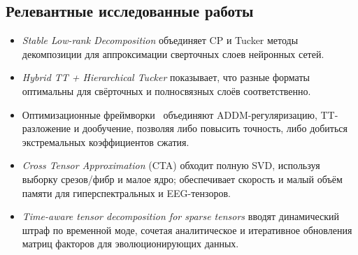 \subsection*{Релевантные исследованные работы}

\begin{itemize}\setlength\itemsep{0.25em}
    \item \emph{Stable Low-rank Decomposition} \cite{stable_low_rank_tensor_decomposition} объединяет CP и Tucker методы декомпозиции для аппроксимации сверточных слоев нейронных сетей.
    \item
    \emph{Hybrid TT + Hierarchical Tucker} \cite{hybrid_tensor_decomposition_c_nn} показывает, что разные форматы оптимальны для свёрточных и полносвязных слоёв соответственно.
    \item Оптимизационные фреймворки~\cite{yin2021efficienttensordecompositionbaseddnn} объединяют ADDM-регуляризацию, TT-разложение и дообучение, позволяя либо повысить точность, либо добиться экстремальных коэффициентов сжатия.
    \item \emph{Cross Tensor Approximation} (CTA) \cite{cross_tensor_approximation} обходит полную SVD, используя выборку срезов/фибр и малое ядро; обеспечивает скорость и малый объём памяти для гиперспектральных и EEG-тензоров.
    \item \emph{Time-aware tensor decomposition for sparse tensors} \cite{time_aware_tensor_decomposition} вводят динамический штраф по временной моде, сочетая аналитическое и итеративное обновления матриц факторов для эволюционирующих данных.
\end{itemize}